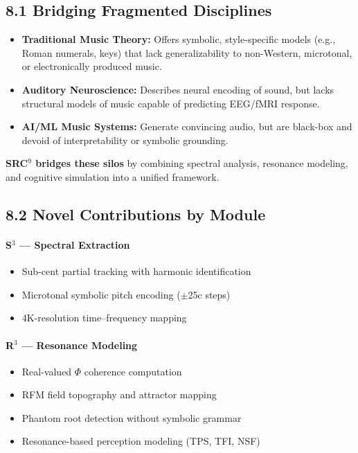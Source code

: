 \subsection*{8.1 Bridging Fragmented Disciplines}

\begin{itemize}
    \item \textbf{Traditional Music Theory:} Offers symbolic, style-specific models (e.g., Roman numerals, keys) that lack generalizability to non-Western, microtonal, or electronically produced music.
    \item \textbf{Auditory Neuroscience:} Describes neural encoding of sound, but lacks structural models of music capable of predicting EEG/fMRI response.
    \item \textbf{AI/ML Music Systems:} Generate convincing audio, but are black-box and devoid of interpretability or symbolic grounding.
\end{itemize}

\textbf{SRC$^{9}$ bridges these silos} by combining spectral analysis, resonance modeling, and cognitive simulation into a unified framework.

\subsection*{8.2 Novel Contributions by Module}

\paragraph{S$^3$ — Spectral Extraction}
\begin{itemize}
    \item Sub-cent partial tracking with harmonic identification
    \item Microtonal symbolic pitch encoding ($\pm$25c steps)
    \item 4K-resolution time–frequency mapping
\end{itemize}

\paragraph{R$^3$ — Resonance Modeling}
\begin{itemize}
    \item Real-valued $\Phi$ coherence computation
    \item RFM field topography and attractor mapping
    \item Phantom root detection without symbolic grammar
    \item Resonance-based perception modeling (TPS, TFI, NSF)
\end{itemize}

